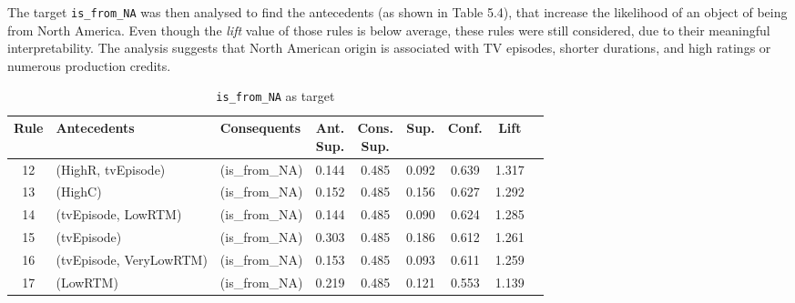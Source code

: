 The target \texttt{is\_from\_NA} was then analysed to find the antecedents (as shown in Table 5.4), that increase the likelihood of an object of 
being from North America. Even though the \textit{lift} value of those rules is below average, these rules were still considered, due to their meaningful interpretability.
The analysis suggests that North American origin is associated with TV episodes, shorter durations, and high ratings or numerous production credits.
\begin{table}[h]
\centering
\begin{tabular}{cllcccccc}
\toprule
\textbf{Rule} & \textbf{Antecedents} & \textbf{Consequents} & \shortstack{\textbf{Ant.}\\\textbf{Sup.}} & \shortstack{\textbf{Cons.}\\\textbf{Sup.}} & \textbf{Sup.} & \textbf{Conf.} & \textbf{Lift} \\
\midrule 
12 & (HighR, tvEpisode) & (is\_from\_NA) & 0.144 & 0.485 & 0.092 & 0.639 & 1.317 \\
13 & (HighC) & (is\_from\_NA) & 0.152 & 0.485 & 0.156 & 0.627 & 1.292 \\
14 & (tvEpisode, LowRTM) & (is\_from\_NA) & 0.144 & 0.485 & 0.090 & 0.624 & 1.285 \\
15 & (tvEpisode) & (is\_from\_NA) & 0.303 & 0.485 & 0.186 & 0.612 & 1.261 \\
16 & (tvEpisode, VeryLowRTM) & (is\_from\_NA) & 0.153 & 0.485 & 0.093 & 0.611 & 1.259 \\
17 & (LowRTM) & (is\_from\_NA) & 0.219 & 0.485 & 0.121 & 0.553 & 1.139 \\
\bottomrule
\end{tabular}
\caption{\texttt{is\_from\_NA} as target}
\end{table}
